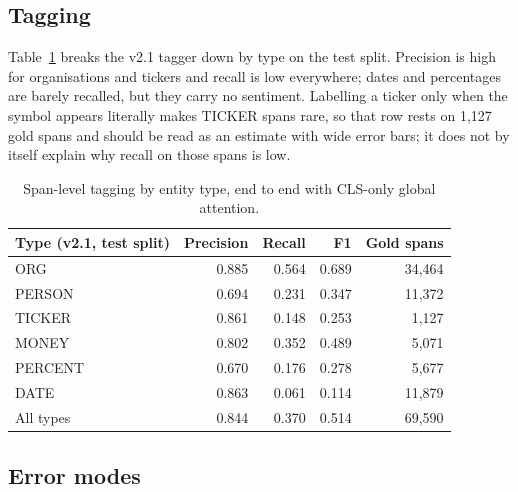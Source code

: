 \documentclass[11pt,letterpaper]{article}
\begin{document}
\subsection{Tagging}

Table~\ref{tab:ner} breaks the v2.1 tagger down by type on the test split. Precision is high for
organisations and tickers and recall is low everywhere; dates and percentages are barely
recalled, but they carry no sentiment. Labelling a ticker only when the symbol appears literally makes TICKER spans rare,
so that row rests on 1{,}127 gold spans and should be read as an estimate with wide error bars;
it does not by itself explain why recall on those spans is low.

\begin{table}[H]
\centering\small
\begin{tabular}{@{}lrrrr@{}}
\toprule
\textbf{Type (v2.1, test split)} & Precision & Recall & F1 & Gold spans \\
\midrule
ORG & 0.885 & 0.564 & 0.689 & 34{,}464 \\
PERSON & 0.694 & 0.231 & 0.347 & 11{,}372 \\
TICKER & 0.861 & 0.148 & 0.253 & 1{,}127 \\
MONEY & 0.802 & 0.352 & 0.489 & 5{,}071 \\
PERCENT & 0.670 & 0.176 & 0.278 & 5{,}677 \\
DATE & 0.863 & 0.061 & 0.114 & 11{,}879 \\
\midrule
All types & 0.844 & 0.370 & 0.514 & 69{,}590 \\
\bottomrule
\end{tabular}
\caption{Span-level tagging by entity type, end to end with CLS-only global attention.}
\label{tab:ner}
\end{table}

\subsection{Error modes}
\end{document}
